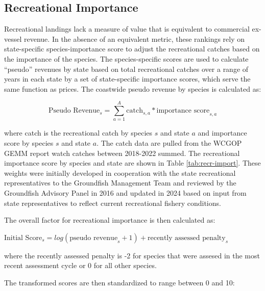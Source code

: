 \documentclass[11pt,
  english,
  a4paper,
]{article}
\begin{document}
\newpage

\hypertarget{recreational-importance}{%
\subsection{Recreational Importance}\label{recreational-importance}}

Recreational landings lack a measure of value that is equivalent to commercial ex-vessel revenue. In the absence of an equivalent metric, these rankings rely on state-specific species-importance score to adjust the recreational catches based on the importance of the species. The species-specific scores are used to calculate ``pseudo'' revenues by state based on total recreational catches over a range of years in each state by a set of state-specific importance scores, which serve the same function as prices. The coastwide pseudo revenue by species is calculated as:

\begin{equation}
\text{Pseudo Revenue}_{s} = \sum_{a=1}^{A} \text{catch}_{s,a}*\text{importance score}_{s,a}  
\end{equation}

where catch is the recreational catch by species \(s\) and state \(a\) and importance score by species \(s\) and state \(a\). The catch data are pulled from the WCGOP GEMM report watch catches between 2018-2022 summed. The recreational importance score by species and state are shown in Table \ref{tab:recr-import}. These weights were initially developed in cooperation with the state recreational representatives to the Groundfish Management Team and reviewed by the Groundfish Advisory Panel in 2016 and updated in 2024 based on input from state representatives to reflect current recreational fishery conditions.

The overall factor for recreational importance is then calculated as:

\begin{centering}

$\text{Initial Score}_s = log(\text{pseudo revenue}_s + 1) + \text{recently assessed penalty}_s$  

\end{centering}

where the recently assessed penalty is -2 for species that were assesed in the most recent assessment cycle or 0 for all other species.

The transformed scores are then standardized to range between 0 and 10:
\end{document}
